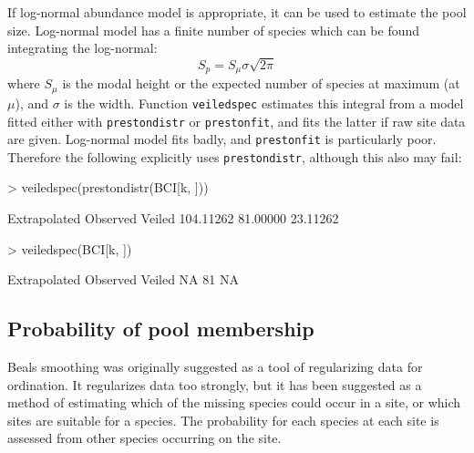 \documentclass[a4paper,10pt]{amsart}
\begin{document}
If log-normal abundance model is appropriate, it can be used to
estimate the pool size.  Log-normal model has a finite number of
species which can be found integrating the log-normal:
\begin{equation}
S_p = S_\mu \sigma \sqrt{2 \pi}
\end{equation}
where $S_\mu$ is the modal height or the expected number of species at
maximum (at $\mu$), and $\sigma$ is the width.  Function
\texttt{veiledspec} estimates this integral from a model fitted either
with \texttt{prestondistr} or \texttt{prestonfit}, and fits the latter
if raw site data are given.  Log-normal model fits badly, and
\texttt{prestonfit} is particularly poor.  Therefore the following
explicitly uses \texttt{prestondistr}, although this also may fail:
\begin{Schunk}
\begin{Sinput}
> veiledspec(prestondistr(BCI[k, ]))
\end{Sinput}
\begin{Soutput}
Extrapolated     Observed       Veiled 
   104.11262     81.00000     23.11262 
\end{Soutput}
\begin{Sinput}
> veiledspec(BCI[k, ])
\end{Sinput}
\begin{Soutput}
Extrapolated     Observed       Veiled 
          NA           81           NA 
\end{Soutput}
\end{Schunk}

\subsection{Probability of pool membership}

Beals smoothing was originally suggested as a tool of regularizing data
for ordination.  It regularizes data too strongly,
but it has been suggested as a method of estimating which of the
missing species could occur in a site, or which sites are suitable for
a species.  The probability for each species at each site is assessed
from other species occurring on the site.
\end{document}
